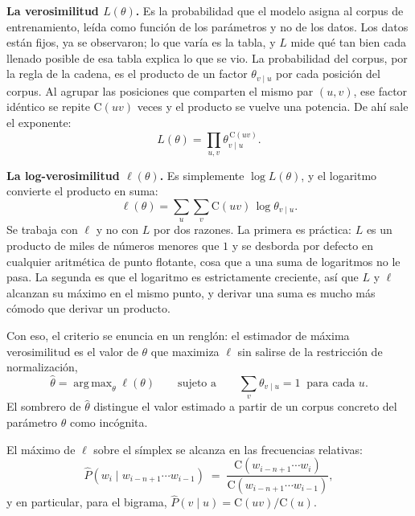 \documentclass[11pt,letterpaper]{article}
\DeclareMathOperator*{\argmax}{arg\,max}
\newcommand{\Count}{\mathrm{C}}
\begin{document}
\textbf{La verosimilitud $L(\theta)$.} Es la probabilidad que el modelo
asigna al corpus de entrenamiento, leída como función de los parámetros
y no de los datos. Los datos están fijos, ya se observaron; lo que
varía es la tabla, y $L$ mide qué tan bien cada llenado posible de esa
tabla explica lo que se vio. La probabilidad del corpus, por la regla
de la cadena, es el producto de un factor $\theta_{v\mid u}$ por cada
posición del corpus. Al agrupar las posiciones que comparten el mismo
par $(u,v)$, ese factor idéntico se repite $\Count(uv)$ veces y el
producto se vuelve una potencia. De ahí sale el exponente:
\[
L(\theta) = \prod_{u,v} \theta_{v\mid u}^{\,\Count(uv)} .
\]

\textbf{La log-verosimilitud $\ell(\theta)$.} Es simplemente
$\log L(\theta)$, y el logaritmo convierte el producto en suma:
\[
\ell(\theta) = \sum_{u}\sum_{v} \Count(uv)\,\log\theta_{v\mid u} .
\]
Se trabaja con $\ell$ y no con $L$ por dos razones. La primera es
práctica: $L$ es un producto de miles de números menores que $1$ y se
desborda por defecto en cualquier aritmética de punto flotante, cosa
que a una suma de logaritmos no le pasa. La segunda es que el logaritmo
es estrictamente creciente, así que $L$ y $\ell$ alcanzan su máximo en
el mismo punto, y derivar una suma es mucho más cómodo que derivar un
producto.

Con eso, el criterio se enuncia en un renglón: el estimador de máxima
verosimilitud es el valor de $\theta$ que maximiza $\ell$ sin salirse
de la restricción de normalización,
\[
\hat\theta=\argmax_\theta \ell(\theta)
\qquad\text{sujeto a}\qquad
\sum_v \theta_{v\mid u}=1 \ \text{ para cada } u .
\]
El sombrero de $\hat\theta$ distingue el valor estimado a partir de un
corpus concreto del parámetro $\theta$ como incógnita.

\begin{teorema}\label{thm:mle}
El máximo de $\ell$ sobre el símplex se alcanza en las frecuencias relativas:
\[
\hat{P}(w_i \mid w_{i-n+1}\cdots w_{i-1}) \;=\; \frac{\Count(w_{i-n+1}\cdots
w_{i})}{\Count(w_{i-n+1}\cdots w_{i-1})},
\]
y en particular, para el bigrama, $\hat{P}(v\mid u) = \Count(uv)/\Count(u)$.
\end{teorema}
\end{document}
